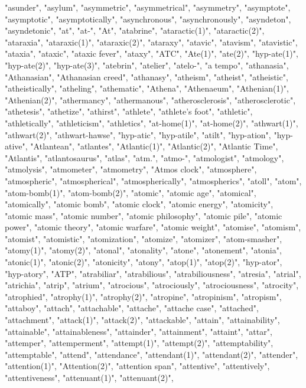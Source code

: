 "asunder",
"asylum",
"asymmetric",
"asymmetrical",
"asymmetry",
"asymptote",
"asymptotic",
"asymptotically",
"asynchronous",
"asynchronously",
"asyndeton",
"asyndetonic",
"at",
"at-",
"At",
"atabrine",
"ataractic(1)",
"ataractic(2)",
"ataraxia",
"ataraxic(1)",
"ataraxic(2)",
"ataraxy",
"atavic",
"atavism",
"atavistic",
"ataxia",
"ataxic",
"ataxic fever",
"ataxy",
"ATC",
"Ate(1)",
"ate(2)",
"hyp-ate(1)",
"hyp-ate(2)",
"hyp-ate(3)",
"atebrin",
"atelier",
"atelo-",
"a tempo",
"athanasia",
"Athanasian",
"Athanasian creed",
"athanasy",
"atheism",
"atheist",
"atheistic",
"atheistically",
"atheling",
"athematic",
"Athena",
"Athenaeum",
"Athenian(1)",
"Athenian(2)",
"athermancy",
"athermanous",
"atherosclerosis",
"atherosclerotic",
"athetesis",
"athetize",
"athirst",
"athlete",
"athlete's foot",
"athletic",
"athletically",
"athleticism",
"athletics",
"at-home(1)",
"at-home(2)",
"athwart(1)",
"athwart(2)",
"athwart-hawse",
"hyp-atic",
"hyp-atile",
"atilt",
"hyp-ation",
"hyp-ative",
"Atlantean",
"atlantes",
"Atlantic(1)",
"Atlantic(2)",
"Atlantic Time",
"Atlantis",
"atlantosaurus",
"atlas",
"atm.",
"atmo-",
"atmologist",
"atmology",
"atmolysis",
"atmometer",
"atmometry",
"Atmos clock",
"atmosphere",
"atmospheric",
"atmospherical",
"atmospherically",
"atmospherics",
"atoll",
"atom",
"atom-bomb(1)",
"atom-bomb(2)",
"atomic",
"atomic age",
"atomical",
"atomically",
"atomic bomb",
"atomic clock",
"atomic energy",
"atomicity",
"atomic mass",
"atomic number",
"atomic philosophy",
"atomic pile",
"atomic power",
"atomic theory",
"atomic warfare",
"atomic weight",
"atomise",
"atomism",
"atomist",
"atomistic",
"atomization",
"atomize",
"atomizer",
"atom-smasher",
"atomy(1)",
"atomy(2)",
"atonal",
"atonality",
"atone",
"atonement",
"atonia",
"atonic(1)",
"atonic(2)",
"atonicity",
"atony",
"atop(1)",
"atop(2)",
"hyp-ator",
"hyp-atory",
"ATP",
"atrabiliar",
"atrabilious",
"atrabiliousness",
"atresia",
"atrial",
"atrichia",
"atrip",
"atrium",
"atrocious",
"atrociously",
"atrociousness",
"atrocity",
"atrophied",
"atrophy(1)",
"atrophy(2)",
"atropine",
"atropinism",
"atropism",
"attaboy",
"attach",
"attachable",
"attache",
"attache case",
"attached",
"attachment",
"attack(1)",
"attack(2)",
"attackable",
"attain",
"attainability",
"attainable",
"attainableness",
"attainder",
"attainment",
"attaint",
"attar",
"attemper",
"attemperment",
"attempt(1)",
"attempt(2)",
"attemptability",
"attemptable",
"attend",
"attendance",
"attendant(1)",
"attendant(2)",
"attender",
"attention(1)",
"Attention(2)",
"attention span",
"attentive",
"attentively",
"attentiveness",
"attenuant(1)",
"attenuant(2)",
